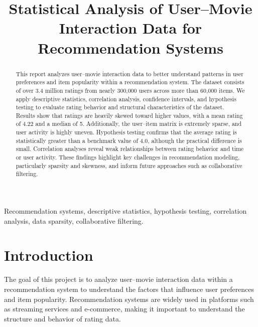 \documentclass[conference]{IEEEtran}
\begin{document}
\title{Statistical Analysis of User--Movie Interaction Data for Recommendation Systems}

\author{
}

\maketitle

\begin{abstract}
This report analyzes user--movie interaction data to better understand patterns in user preferences and item popularity within a recommendation system. The dataset consists of over 3.4 million ratings from nearly 300{,}000 users across more than 60{,}000 items. We apply descriptive statistics, correlation analysis, confidence intervals, and hypothesis testing to evaluate rating behavior and structural characteristics of the dataset. Results show that ratings are heavily skewed toward higher values, with a mean rating of 4.22 and a median of 5. Additionally, the user--item matrix is extremely sparse, and user activity is highly uneven. Hypothesis testing confirms that the average rating is statistically greater than a benchmark value of 4.0, although the practical difference is small. Correlation analyses reveal weak relationships between rating behavior and time or user activity. These findings highlight key challenges in recommendation modeling, particularly sparsity and skewness, and inform future approaches such as collaborative filtering.
\end{abstract}

\begin{IEEEkeywords}
Recommendation systems, descriptive statistics, hypothesis testing, correlation analysis, data sparsity, collaborative filtering.
\end{IEEEkeywords}

\section{Introduction}

The goal of this project is to analyze user--movie interaction data within a recommendation system to understand the factors that influence user preferences and item popularity. Recommendation systems are widely used in platforms such as streaming services and e-commerce, making it important to understand the structure and behavior of rating data.
\end{document}
